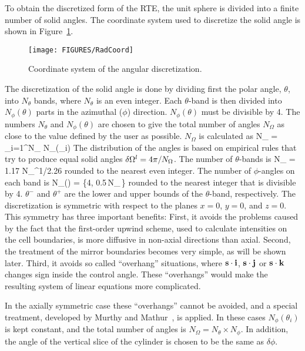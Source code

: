 To obtain the discretized form of the RTE, the unit sphere is divided into a finite number of solid angles.
The coordinate system used to discretize the solid angle is
shown in Figure~\ref{Angular}.
\begin{figure}[ht]
\begin{center}
\texttt{[image: FIGURES/RadCoord]}
\caption[Coordinate system of the angular discretization]{Coordinate system of the angular discretization.}
\label{Angular}
\end{center}
\end{figure}
The discretization of the solid angle is done by dividing first
the polar angle, $\theta$, into $N_{\theta}$ bands, where
$N_{\theta}$ is an even integer.
Each $\theta$-band is then divided into
$N_{\phi}(\theta)$ parts in the azimuthal ($\phi$) direction.
$N_{\phi}(\theta)$ must be divisible by 4.
The numbers $N_{\theta}$ and $N_{\phi}(\theta)$ are chosen
to give the total number of angles $N_{\Omega}$ as close to
the value defined by the user as possible.
$N_{\Omega}$ is calculated as
\be
 N_{\Omega} = \sum_{i=1}^{N_{\theta}} N_{\phi}(\theta_i)
\ee
The distribution of the angles is based on empirical rules that try
to produce equal solid angles $\delta {\Omega}^l = 4\pi/N_{\Omega}$. The
number of $\theta$-bands is
\be
 N_{\theta} = 1.17 \; N_{\Omega}^{1/2.26}
\ee
rounded to the nearest even integer. The number of $\phi$-angles
on each band is
\be
 N_{\phi}(\theta) = \max\left\{4,
        0.5\,N_{\Omega}\,\left[\cos(\theta^-)-\cos(\theta^+)\right]\right\}
\ee
rounded to the nearest integer that is divisible by 4.
$\theta^-$ and $\theta^+$ are
the lower and upper bounds of the $\theta$-band, respectively.
The discretization is symmetric with respect to the planes $x=0$, $y=0$, and
$z=0$. This symmetry has three important benefits:
First, it avoids the problems caused by the fact that the first-order
upwind scheme, used to calculate intensities on the cell boundaries,
is more diffusive in non-axial directions than axial.
Second, the treatment of the mirror boundaries becomes very simple, as
will be shown later. Third,
it avoids so called
``overhang'' situations, where ${\mathbf{s}}\cdot {\bf i}$, ${\mathbf{s}}\cdot {\bf j}$
or ${\mathbf{s}}\cdot {\bf k}$ changes sign inside
the control angle. These ``overhangs'' would make the resulting system of
linear equations more complicated.

In the axially symmetric case these ``overhangs'' cannot be avoided, and a
special treatment, developed by Murthy and Mathur~\cite{Murthy}, is
applied. In these cases $N_{\phi}(\theta_i)$ is kept constant, and
the total number of angles is $N_{\Omega} = N_{\theta} \times
N_{\phi}$. In addition, the angle of the vertical slice of the cylinder is
chosen to be the same as $\delta\phi$.



